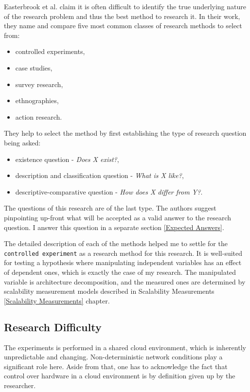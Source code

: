 \documentclass{uvamscse}
\begin{document}
Easterbrook et al. \cite{EastBr} claim it is often difficult to identify the true underlying nature of the research problem and thus the best method to research it. In their work, they name and compare five most common classes of research methods to select from:
\begin{itemize}
  \item controlled experiments,
  \item case studies,
  \item survey research,
  \item ethnographies,
  \item action research.
\end{itemize}
They help to select the method by first establishing the type of research question being asked:
\begin{itemize}
  \item existence question - \textit{Does X exist?},
  \item description and classification question - \textit{What is X like?},
  \item descriptive-comparative question - \textit{How does X differ from Y?}.
\end{itemize}
The questions of this research are of the last type. The authors \cite{EastBr} suggest pinpointing up-front what will be accepted as a valid answer to the research question. I answer this question in a separate section \ref{Expected Answers}.

The detailed description of each of the methods helped me to settle for the \texttt{controlled experiment} as a research method for this research. It is well-suited for testing a hypothesis where manipulating independent variables has an effect of dependent ones, which is exactly the case of my research. The manipulated variable is architecture decomposition, and the measured ones are determined by scalability measurement models described in Scalability Measurements \ref{Scalability Measurements} chapter.

\subsection{Research Difficulty}
The experiments is performed in a shared cloud environment, which is inherently unpredictable and changing. Non-deterministic network conditions play a significant role here. Aside from that, one has to acknowledge the fact that control over hardware in a cloud environment is by definition given up by the researcher.
\end{document}
